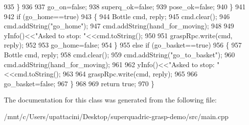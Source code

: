\begin{DoxyCode}
935             \}
936 
937             go\_on=\textcolor{keyword}{false};
938             superq\_ok=\textcolor{keyword}{false};
939             pose\_ok=\textcolor{keyword}{false};
940         \}
941 
942         \textcolor{keywordflow}{if} (go\_home==\textcolor{keyword}{true})
943         \{
944             Bottle cmd, reply;
945             cmd.clear();
946             cmd.addString(\textcolor{stringliteral}{"go\_home"});
947             cmd.addString(hand\_for\_moving);
948 
949             yInfo()<<\textcolor{stringliteral}{"Asked to stop: "}<<cmd.toString();
950 
951             graspRpc.write(cmd, reply);
952 
953             go\_home=\textcolor{keyword}{false};
954         \}
955         \textcolor{keywordflow}{else} \textcolor{keywordflow}{if} (go\_basket==\textcolor{keyword}{true})
956         \{
957             Bottle cmd, reply;
958             cmd.clear();
959             cmd.addString(\textcolor{stringliteral}{"go\_to\_basket"});
960             cmd.addString(hand\_for\_moving);
961 
962             yInfo()<<\textcolor{stringliteral}{"Asked to stop: "}<<cmd.toString();
963 
964             graspRpc.write(cmd, reply);
965 
966             go\_basket=\textcolor{keyword}{false};
967         \}
968 
969         \textcolor{keywordflow}{return} \textcolor{keyword}{true};
970     \}
\end{DoxyCode}


The documentation for this class was generated from the following file\+:\begin{DoxyCompactItemize}
\item 
/mnt/c/\+Users/upattacini/\+Desktop/superquadric-\/grasp-\/demo/src/main.\+cpp\end{DoxyCompactItemize}
